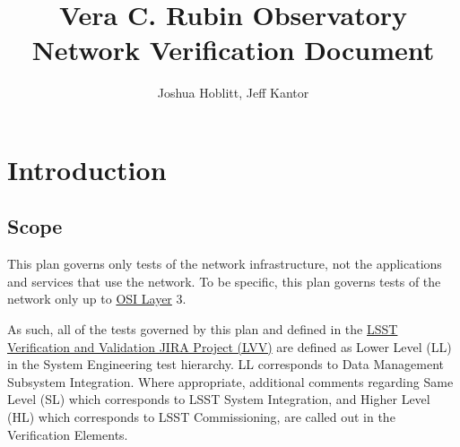 \documentclass[DM,lsstdraft,STS,toc]{lsstdoc}
\begin{document}
\providecommand{\tightlist}{%
  \setlength{\itemsep}{0pt}\setlength{\parskip}{0pt}}

\def\product{LSST Data Management}


\title[Network Verification Document]{Vera C. Rubin Observatory Network Verification Document}

\author{Joshua Hoblitt, Jeff Kantor}
\setDocRef{\lsstDocType-\lsstDocNum}
\setDocDate{\today}



\setDocUpstreamVersion{\vcsRevision}

\maketitle


\section{Introduction}\label{sec:intro}


\subsection{Scope}\label{sec:scope}

This plan governs only tests of the network infrastructure, not the applications and services that
use the network. To be specific, this plan governs tests of the network only up to
\href{https://en.wikipedia.org/wiki/OSI_model}{OSI Layer} 3.

As such, all of the tests governed by this plan and defined in the
\href{https://jira.lsstcorp.org/projects/LVV/}{LSST Verification and Validation JIRA Project (LVV)}
are defined as Lower Level (LL) in the System Engineering test hierarchy. LL
corresponds to Data Management Subsystem Integration. Where appropriate, additional
comments regarding Same Level (SL) which corresponds to LSST System Integration, and Higher
Level (HL) which corresponds to LSST Commissioning, are called out in the Verification
Elements.
\end{document}
